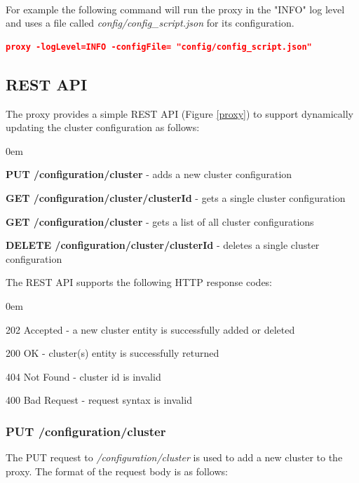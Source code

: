 \documentclass[a4paper,11pt,twoside]{article}
\begin{document}
\noindent\\
For example the following command will run the proxy in the "INFO" log level and uses a file called \textit{config/config\_script.json} for its configuration. 

\begin{lstlisting}[language=json,firstnumber=1]
proxy -logLevel=INFO -configFile= "config/config_script.json" 
\end{lstlisting}
 
\subsection{REST API}
The proxy provides a simple REST API (Figure \ref{proxy}) to support dynamically updating the cluster configuration as follows:

\begin{list}{-}{}
  \itemsep0em
  \item\textbf{{PUT /configuration/cluster}} - adds a new cluster configuration
  
  \item\textbf{{GET /configuration/cluster/{clusterId}}} -  gets a single cluster configuration
  
   \item\textbf{{GET /configuration/cluster}} - gets a list of all cluster configurations
   
   \item\textbf{{DELETE /configuration/cluster/{clusterId}}} -  deletes a single cluster configuration
  
\end{list}
\noindent
The REST API supports the following HTTP response codes:

\begin{list}{-}{}
  \itemsep0em
  \item{202 Accepted}  -  a new cluster entity is successfully added or deleted
  
  \item{200 OK} -  cluster(s) entity is successfully returned
  
   \item{404 Not Found} - cluster id is invalid
   
    \item{400 Bad Request } - request syntax is invalid
  
\end{list}

\subsubsection{PUT /configuration/cluster}\label{PUT}
The PUT request to \textit{/configuration/cluster}  is used to add a new cluster to the proxy. The format of the request body is as follows:\\
\end{document}
